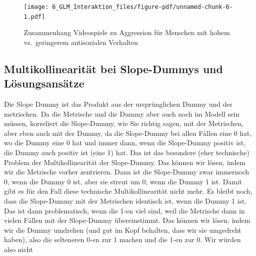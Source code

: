 \documentclass[
  10pt,
  letterpaper,
  a4paper, twoside]{scrreprt}
\begin{document}
\begin{figure}[H]

{\centering \texttt{[image: 6\_GLM\_Interaktion\_files/figure-pdf/unnamed-chunk-6-1.pdf]}

}

\caption{Zusammenhang Videospiele zu Aggression für Menschen mit hohem
vs.~geringerem antisozialen Verhalten}

\end{figure}%

\subsection{Multikollinearität bei Slope-Dummys und
Lösungsansätze}\label{multikollinearituxe4t-bei-slope-dummys-und-luxf6sungsansuxe4tze}

\begin{tcolorbox}[enhanced jigsaw, coltitle=black, opacitybacktitle=0.6, toptitle=1mm, colbacktitle=quarto-callout-important-color!10!white, colback=white, toprule=.15mm, opacityback=0, bottomrule=.15mm, arc=.35mm, colframe=quarto-callout-important-color-frame, leftrule=.75mm, titlerule=0mm, breakable, left=2mm, rightrule=.15mm, title={Q\&A: Welches besondere Problem gibt es bei Slop-Dummys mit
Multikollinearität und wie löst man es?}, bottomtitle=1mm]

Die Slope Dummy ist das Produkt aus der ursprünglichen Dummy und der
metrischen. Da die Metrische und die Dummy aber auch noch im Modell sein
müssen, korreliert die Slope-Dummy, wie Sie richtig sagen, mit der
Metrischen, aber eben auch mit der Dummy, da die Slope-Dummy bei allen
Fällen eine 0 hat, wo die Dummy eine 0 hat und immer dann, wenn die
Slope-Dummy positiv ist, die Dummy auch positiv ist (eine 1) hat. Das
ist das besondere (eher technische) Problem der Multikollinearität der
Slope-Dummy. Das können wir lösen, indem wir die Metrische vorher
zentrieren. Dann ist die Slope-Dummy zwar immernoch 0, wenn die Dummy 0
ist, aber sie streut um 0, wenn die Dummy 1 ist. Damit gibt es für den
Fall diese technische Multikollinearität nicht mehr. Es bleibt noch,
dass die Slope-Dummy mit der Metrischen identisch ist, wenn die Dummy 1
ist. Das ist dann problematisch, wenn die 1-en viel sind, weil die
Metrische dann in vielen Fällen mit der Slope-Dummy übereinstimmt. Das
können wir lösen, indem wir die Dummy umdrehen (und gut im Kopf
behalten, dass wir sie umgedreht haben), also die selteneren 0-en zur 1
machen und die 1-en zur 0. Wir würden also nicht


\end{tcolorbox}
\end{document}
